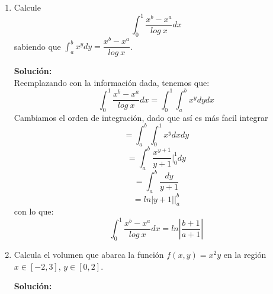 \documentclass[12pt]{article}
\newenvironment{solucion}
{\begin{mdframed}[backgroundcolor=black!10]
		{\bf Solución:}\\
	}
	{
	\end{mdframed}
}
\newenvironment{preguntas}
{\begin{enumerate}\itemsep12pt
	}
	{
	\end{enumerate}
}
\newcommand{\ev}{\Big|}
\begin{document}
\begin{preguntas}
\begin{solucion}
\begin{enumerate}[a)]
\item $\displaystyle\int_2^4 \displaystyle\int_1^2 ye^{xy}dxdy = 
			\displaystyle\int_2^4 e^{xy} \ev_1^2 dy = 
			\displaystyle\int_2^4 e^{2y} - e^{y} dy =
			\dfrac{1}{2}e^{2y}\ev_2^4 - e^{y}\ev_2^4$\\
			$=\dfrac{1}{2}e^8 - \dfrac{1}{2}e^4 - e^4 + e^2 =
			\dfrac{1}{2}e^8 - \dfrac{3}{2}e^4 + e^2$	
\item $\displaystyle\int_{-1}^1\displaystyle\int_{-1}^1 \dfrac{xy}{1+x^2+y^2}dxdy = 
			\displaystyle\int_{-1}^1 \dfrac{y}{2} \displaystyle\int_{-1}^1 \dfrac{2x}{1+x^2+y^2}dxdy$\\
			$= \displaystyle\int_{-1}^1 \dfrac{y}{2} ln(1+x^2+y^2) \ev_{-1}^1 dy = 
			\displaystyle\int_{-1}^1 \dfrac{y}{2}( ln(2+y^2) - ln(2+y^2) ) dy$\\
			$=0$
\end{enumerate}
\end{solucion}
\item Calcule
	$$ \displaystyle\int_0^1 \dfrac{x^b - x^a}{log\ x}dx$$
	sabiendo que $\displaystyle\int_a^b x^y dy = \dfrac{x^b - x^a}{log\ x}$.
\begin{solucion}
Reemplazando con la información dada, tenemos que:
		$$ \displaystyle\int_0^1 \dfrac{x^b - x^a}{log\ x}dx = \displaystyle\int_0^1 \displaystyle\int_a^b x^y dydx $$
		Cambiamos el orden de integración, dado que así es más facil integrar
		$$ = \displaystyle\int_a^b \displaystyle\int_0^1 x^y dxdy $$
		$$ = \displaystyle\int_a^b \dfrac{x^{y+1}}{y+1} \ev_0^1 dy $$
		$$ = \displaystyle\int_a^b \dfrac{dy}{y+1} $$
		$$ = ln|y+1|\ev_a^b $$
		con lo que:
		$$ \displaystyle\int_0^1 \dfrac{x^b - x^a}{log\ x}dx = ln\left|\dfrac{b+1}{a+1}\right| $$
\end{solucion}
\item Calcula el volumen que abarca la función $f(x,y) = x^2y$ en la región $x \in [-2, 3]$, $y \in [0,2]$.
\begin{solucion}

\end{solucion}
\end{preguntas}
\end{document}
